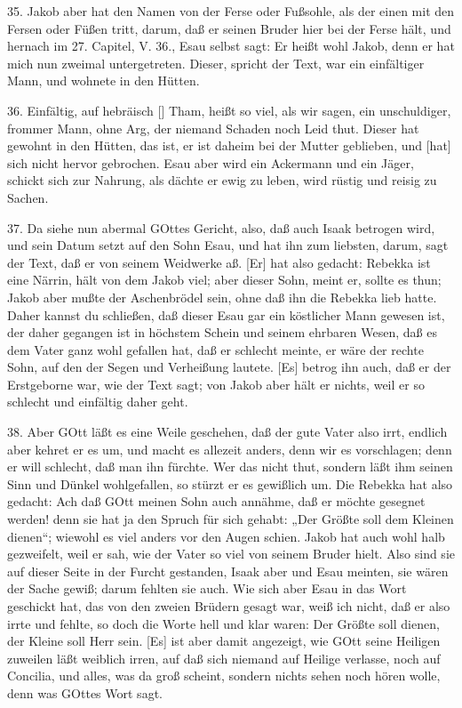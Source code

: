 35. Jakob aber hat den Namen von der Ferse oder Fußsohle, als der einen mit den Fersen oder Füßen tritt, darum, daß er seinen Bruder hier bei der Ferse hält, und hernach im 27. Capitel, V. 36., Esau selbst sagt: Er heißt wohl Jakob, denn er hat mich nun zweimal untergetreten. Dieser, spricht der Text, war ein einfältiger Mann, und wohnete in den Hütten.

36. Einfältig, auf hebräisch [] Tham, heißt so viel, als wir sagen, ein unschuldiger, frommer Mann, ohne Arg, der niemand Schaden noch Leid thut. Dieser hat gewohnt in den Hütten, das ist, er ist daheim bei der Mutter geblieben, und [hat] sich nicht hervor gebrochen. Esau aber wird ein Ackermann und ein Jäger, schickt sich zur Nahrung, als dächte er ewig zu leben, wird rüstig und reisig zu Sachen.

37. Da siehe nun abermal GOttes Gericht, also, daß auch Isaak betrogen wird, und sein Datum setzt auf den Sohn Esau, und hat ihn zum liebsten, darum, sagt der Text, daß er von seinem Weidwerke aß. [Er] hat also gedacht: Rebekka ist eine Närrin, hält von dem Jakob viel; aber dieser Sohn, meint er, sollte es thun; Jakob aber mußte der Aschenbrödel sein, ohne daß ihn die Rebekka lieb hatte. Daher kannst du schließen, daß dieser Esau gar ein köstlicher Mann gewesen ist, der daher gegangen ist in höchstem Schein und seinem ehrbaren Wesen, daß es dem Vater ganz wohl gefallen hat, daß er schlecht meinte, er wäre der rechte Sohn, auf den der Segen und Verheißung lautete. [Es] betrog ihn auch, daß er der Erstgeborne war, wie der Text sagt; von Jakob aber hält er nichts, weil er so schlecht und einfältig daher geht.

38. Aber GOtt läßt es eine Weile geschehen, daß der gute Vater also irrt, endlich aber kehret er es um, und macht es allezeit anders, denn wir es vorschlagen; denn er will schlecht, daß man ihn fürchte. Wer das nicht thut, sondern läßt ihm seinen Sinn und Dünkel wohlgefallen, so stürzt er es gewißlich um. Die Rebekka hat also gedacht: Ach daß GOtt meinen Sohn auch annähme, daß er möchte gesegnet werden! denn sie hat ja den Spruch für sich gehabt: „Der Größte soll dem Kleinen dienen“; wiewohl es viel anders vor den Augen schien. Jakob hat auch wohl halb gezweifelt, weil er sah, wie der Vater so viel von seinem Bruder hielt. Also sind sie auf dieser Seite in der Furcht gestanden, Isaak aber und Esau meinten, sie wären der Sache gewiß; darum fehlten sie auch. Wie sich aber Esau in das Wort geschickt hat, das von den zweien Brüdern gesagt war, weiß ich nicht, daß er also irrte und fehlte, so doch die Worte hell und klar waren: Der Größte soll dienen, der Kleine soll Herr sein. [Es] ist aber damit angezeigt, wie GOtt seine Heiligen zuweilen läßt weiblich irren, auf daß sich niemand auf Heilige verlasse, noch auf Concilia, und alles, was da groß scheint, sondern nichts sehen noch hören wolle, denn was GOttes Wort sagt.

